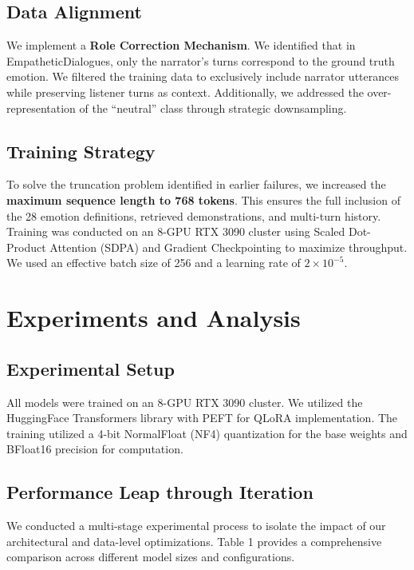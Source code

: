 \documentclass[11pt]{article}
\begin{document}
\subsection{Data Alignment}
We implement a \textbf{Role Correction Mechanism}. We identified that in EmpatheticDialogues, only the narrator's turns correspond to the ground truth emotion. We filtered the training data to exclusively include narrator utterances while preserving listener turns as context. Additionally, we addressed the over-representation of the ``neutral'' class through strategic downsampling.

\subsection{Training Strategy}
To solve the truncation problem identified in earlier failures, we increased the \textbf{maximum sequence length to 768 tokens}. This ensures the full inclusion of the 28 emotion definitions, retrieved demonstrations, and multi-turn history. Training was conducted on an 8-GPU RTX 3090 cluster using Scaled Dot-Product Attention (SDPA) and Gradient Checkpointing to maximize throughput. We used an effective batch size of 256 and a learning rate of $2\times10^{-5}$.

\section{Experiments and Analysis}
\subsection{Experimental Setup}
All models were trained on an 8-GPU RTX 3090 cluster. We utilized the HuggingFace Transformers library with PEFT for QLoRA implementation. The training utilized a 4-bit NormalFloat (NF4) quantization for the base weights and BFloat16 precision for computation.

\subsection{Performance Leap through Iteration}
We conducted a multi-stage experimental process to isolate the impact of our architectural and data-level optimizations. Table 1 provides a comprehensive comparison across different model sizes and configurations.
\end{document}
